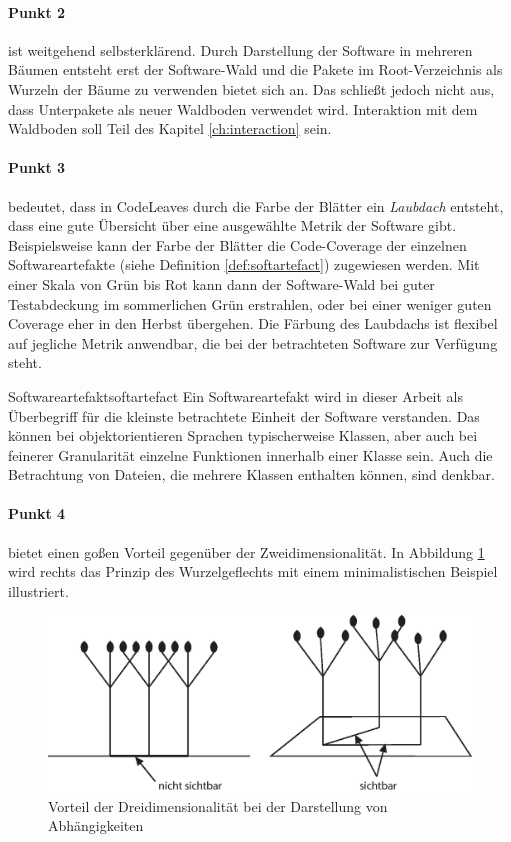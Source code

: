 \paragraph{Punkt 2} ist weitgehend selbsterklärend. Durch Darstellung der Software in mehreren Bäumen entsteht erst der Software-Wald und die Pakete im Root-Verzeichnis als Wurzeln der Bäume zu verwenden bietet sich an. Das schließt jedoch nicht aus, dass Unterpakete als neuer Waldboden verwendet wird. Interaktion mit dem Waldboden soll Teil des Kapitel \ref{ch:interaction} sein.

\paragraph{Punkt 3} bedeutet, dass in CodeLeaves durch die Farbe der Blätter ein \emph{Laubdach} entsteht, dass eine gute Übersicht über eine ausgewählte Metrik der Software gibt. Beispielsweise kann der Farbe der Blätter die Code-Coverage der einzelnen Softwareartefakte (siehe Definition \ref{def:softartefact}) zugewiesen werden. Mit einer Skala von Grün bis Rot kann dann der Software-Wald bei guter Testabdeckung im sommerlichen Grün erstrahlen, oder bei einer weniger guten Coverage eher in den Herbst übergehen. Die Färbung des Laubdachs ist flexibel auf jegliche Metrik anwendbar, die bei der betrachteten Software zur Verfügung steht.

\begin{defbox}{Softwareartefakt}{softartefact}
  Ein Softwareartefakt wird in dieser Arbeit als Überbegriff für die kleinste betrachtete Einheit der Software verstanden. Das können bei objektorientieren Sprachen typischerweise Klassen, aber auch bei feinerer Granularität einzelne Funktionen innerhalb einer Klasse sein. Auch die Betrachtung von Dateien, die mehrere Klassen enthalten können, sind denkbar.
\end{defbox}

\paragraph{Punkt 4} bietet einen goßen Vorteil gegenüber der Zweidimensionalität. In Abbildung \ref{fig:3d-advantage} wird rechts das Prinzip des Wurzelgeflechts mit einem minimalistischen Beispiel illustriert.

\begin{figure}[htb]
  \includegraphics[width=.8\textwidth]{figures/3d-advantage}
  \caption{Vorteil der Dreidimensionalität bei der Darstellung von Abhängigkeiten}
  \label{fig:3d-advantage}
\end{figure}

